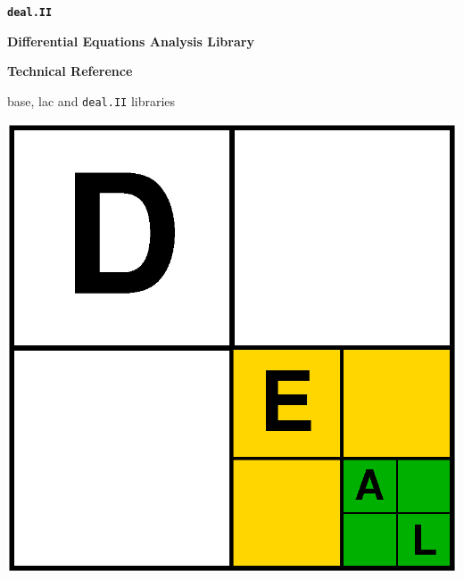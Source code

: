 \documentclass{report}
\begin{document}

\sbox{\cxxHeadName}{}

\vspace*{3cm}

\begin{center}
  \textbf{\texttt{\Huge deal.II}}


\vspace*{1cm}

\textbf{\huge Differential Equations Analysis Library}

\vspace*{1cm}

\textbf{\LARGE Technical Reference}

\vspace*{1cm}

  {\Large \textsf{base}, \textsf{lac} and \texttt{deal.II} libraries}

\vspace*{1.5cm}

\includegraphics[width=.8\textwidth]{../../pictures/deal.eps}
\end{center}


\tableofcontents
\end{document}
